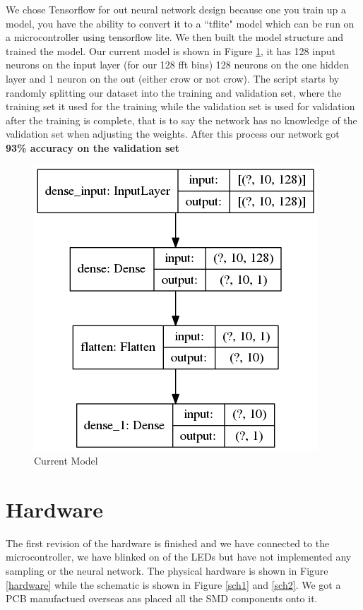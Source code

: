 \documentclass{article}
\begin{document}
We chose Tensorflow for out neural network design because one you train up a model, you have the ability to convert it to a ``tflite" model which can be run on a microcontroller using tensorflow lite. We then built the model structure and trained the model. Our current model is shown in Figure \ref{model}, it has 128 input neurons on the input layer (for our 128 fft bins) 128 neurons on the one hidden layer and 1 neuron on the out (either crow or not crow). The script starts by randomly splitting our dataset into the training and validation set, where the training set it used for the training while the validation set is used for validation after the training is complete, that is to say the network has no knowledge of the validation set when adjusting the weights. After this process our network got \textbf{93\% accuracy on the validation set}


\begin{figure}[H]
\centering
\includegraphics[scale=0.3]{../NN/audio/src/model.png}
\caption{Current Model}
\label{model}
\end{figure}
\newpage

\section{Hardware}
The first revision of the hardware is finished and we have connected to the microcontroller, we have blinked on of the LEDs but have not implemented any sampling or the neural network. The physical hardware is shown in Figure \ref{hardware} while the schematic is shown in Figure \ref{sch1} and \ref{sch2}. We got a PCB manufactued overseas ans placed all the SMD components onto it.
 
\end{document}
